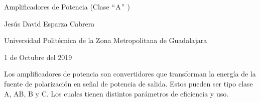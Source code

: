 \documentclass[12pt]{article}
\begin{document}
\begin{adjustwidth}{0.0in}{0.01in}
\begin{Center}
{\fontsize{17pt}{20.4pt}\selectfont \textcolor[HTML]{21409A}{Amplificadores de Potencia (Clase $``$A$"$ )}\par}
\end{Center}\par

\end{adjustwidth}


\vspace{\baselineskip}
\begin{adjustwidth}{0.0in}{0.01in}
\begin{Center}
{\fontsize{14pt}{16.8pt}\selectfont \textcolor[HTML]{21409A}{Jesús David Esparza Cabrera}\par}
\end{Center}\par

\end{adjustwidth}


\vspace{\baselineskip}
\begin{adjustwidth}{0.0in}{0.01in}
\begin{Center}
{\fontsize{14pt}{16.8pt}\selectfont \textcolor[HTML]{21409A}{Universidad Politécnica de la Zona Metropolitana de Guadalajara}\par}
\end{Center}\par

\end{adjustwidth}


\vspace{\baselineskip}
\begin{adjustwidth}{0.0in}{0.01in}
\begin{Center}
{\fontsize{14pt}{16.8pt}\selectfont \textcolor[HTML]{21409A}{1 de Octubre del 2019}\par}
\end{Center}\par

\end{adjustwidth}


\vspace{\baselineskip}

\vspace{\baselineskip}

\vspace{\baselineskip}
\begin{adjustwidth}{1.21in}{1.22in}
\begin{justify}
{\fontsize{11pt}{13.2pt}\selectfont Los amplificadores de potencia son convertidores que transforman la energía de la fuente de polarización en señal de potencia de salida. Estos pueden ser tipo clase A, AB, B y C. Los cuales tienen distintos parámetros de eficiencia y uso.\par}
\end{justify}\par

\end{adjustwidth}
\end{document}
